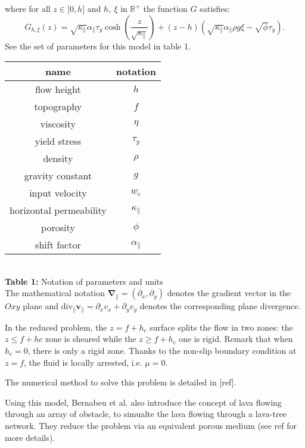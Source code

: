 \documentclass[11pt,a4paper]{article}
\newcommand{\Nabla}{\boldsymbol{\nabla}}
\newcommand{\Frac}[2]{\displaystyle \frac{#1}{#2} }
\newcommand{\R}{\mathbb{R}}
\begin{document}
where for all $z\in ]0,h]$ and $h,~\xi$ in $\R^+$ the function $G$ satisfies:
\begin{equation*}
G_{h,\xi} (z) =  \sqrt{\kappa_\parallel} \alpha_\parallel \tau_y \cosh\left(\Frac{z}{\sqrt{\kappa_\parallel}}\right) 
                              + ( z -  h )\left(\sqrt{\kappa_\parallel} \alpha_\parallel \rho g \xi-\sqrt{\phi} \tau_y \right).
\end{equation*}
See the set of parameters for this model in table 1. \\

\begin{tabular}{|c|c|}%
      \hline name & notation  \\ \hline
      flow height & $h$  \\
      topography  & $f$  \\
      viscosity & $\eta$  \\
      yield stress & $\tau_y$  \\
      density & $\rho$  \\
      gravity constant & $g$ \\
      input velocity  & $w_e$  \\
      horizontal permeability & $\kappa_\parallel$  \\
      porosity & $\phi$  \\
      shift factor & $\alpha_\parallel$ \\ \hline
\end{tabular}%
\\
{\bf{Table 1}:} Notation of parameters and units
 \\
 
The mathematical notation
\mbox{$
	\Nabla_{\parallel} = (\partial_x, \partial_y)
$}
denotes the gradient vector in the $Oxy$ plane and
\mbox{$
	\text{div}_{\parallel} \mathbf{v}_{\parallel} = \partial_x v_x + \partial_y v_y
$}
denotes the corresponding plane divergence.

In the reduced problem, the $z = f + h_c$ surface splits the flow in
two zones: the $z \leq f +hc$ zone is sheared while the $z \geq f +h_c$ one is rigid. Remark
that when $h_c = 0$, there is only a rigid zone. Thanks to the non-slip boundary condition at $z = f$, the fluid is locally arrested, i.e. $\mu=0$.

The numerical method to solve this problem is detailed in [ref].

Using this model, Bernabeu et al. also introduce the concept of lava flowing through an array of obstacle, to simualte the lava flowing through a lava-tree network. They reduce the problem via an equivalent porous medium (see ref for more details).
\end{document}

